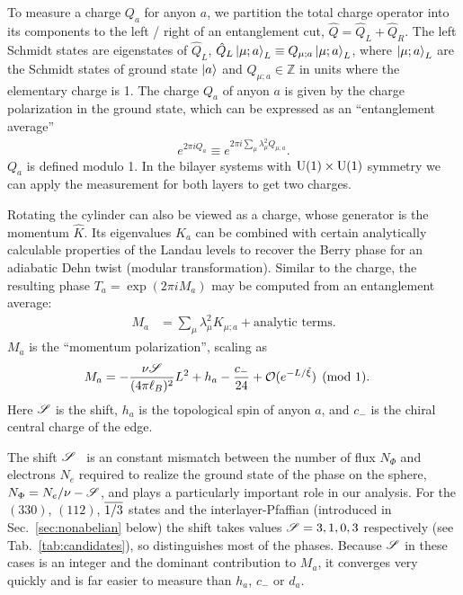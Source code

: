 To measure a \Uone charge $Q_a$ for anyon $a$, we partition the total charge operator into its components to the left / right of an entanglement cut, $\hat{Q} = \hat{Q}_L + \hat{Q}_R$. 
The left Schmidt states are eigenstates of $\hat{Q}_L$, $\hat{Q}_L \ket{\mu; a}_L \equiv Q_{\mu; a} \ket{\mu; a}_L $, where $\ket{\mu; a}_L$ are the Schmidt states of ground state $\ket{a}$ and $Q_{\mu; a} \in \mathbb{Z}$ in units where the elementary charge is 1.
The charge $Q_a$ of anyon $a$ is given by the charge polarization in the ground state, which can be expressed as an ``entanglement average'' \cite{ZaletelQHdmrg13}
\begin{align}
	e^{2 \pi i Q_a} \equiv e^{2 \pi i \sum_\mu \lambda^2_\mu Q_{\mu; a}}.
\end{align}
$Q_a$ is defined modulo 1.
In the bilayer systems with $\mathrm{U(1)}\times\mathrm{U(1)}$ symmetry we can apply the measurement for both layers to get two charges.

Rotating the cylinder can also be viewed as a \Uone charge, whose generator is the momentum $\hat{K}$.
Its eigenvalues $K_a$ can be combined with certain analytically calculable properties of the Landau levels to recover 
the Berry phase for an adiabatic Dehn twist (modular transformation).
Similar to the charge, the resulting phase $T_a = \exp(2\pi i M_a)$ may be computed from an entanglement average:
\begin{align}
	M_a &=  \sum_\mu \lambda^2_\mu K_{\mu; a} + \textrm{analytic terms} .
\end{align}
$M_a$ is the ``momentum polarization'', scaling as \cite{ZaletelQHdmrg13,HHTuMomPol13}
\begin{align}
	M_a &= -\frac{\nu\mathscr{S}}{(4\pi\ell_B)^2}L^2 + h_a - \frac{c_-}{24} + \mathcal{O}(e^{-L / \tilde{\xi}}) \pmod{1}.
	\label{mompol}
\end{align}
Here $\mathscr{S}$ is the shift, $h_a$ is the topological spin of anyon $a$, and $c_-$ is the chiral central charge of the edge.

The shift $\mathscr{S}$~\cite{wenzee} is an constant mismatch between the number of flux $N_\Phi$ and electrons $N_e$ required to realize the ground state of the phase on the sphere, $N_\Phi= N_e / \nu - \mathscr{S}$, and plays a particularly important role in our analysis.
For the $(330)$, $(112)$,  $\overline{1/3}$ states and the interlayer-Pfaffian (introduced in Sec.~\ref{sec:nonabelian} below) the shift takes values $\mathscr{S} = 3, 1, 0, 3$ respectively (see Tab.~\ref{tab:candidates}), so distinguishes most of the phases.
Because $\mathscr{S}$ in these cases is an integer and the dominant contribution to $M_a$, it converges very quickly and is far easier to measure than $h_a$, $c_-$ or $d_a$.


